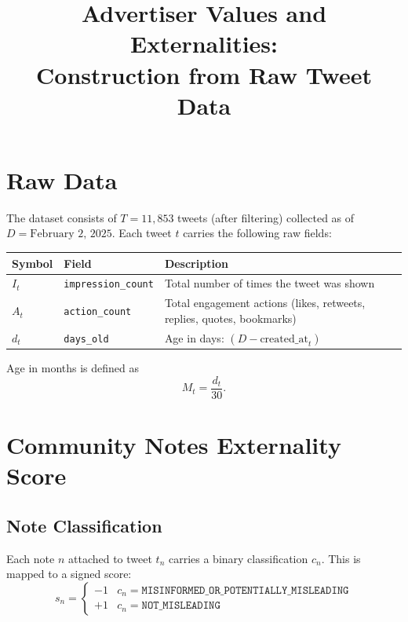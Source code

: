 \documentclass[11pt]{article}
\title{Advertiser Values and Externalities:\\Construction from Raw Tweet Data}
\date{}
\begin{document}
\maketitle

\section{Raw Data}

The dataset consists of $T = 11{,}853$ tweets (after filtering) collected as of $D = \text{February 2, 2025}$.
Each tweet $t$ carries the following raw fields:

\begin{center}
\begin{tabular}{lll}
\toprule
Symbol & Field & Description \\
\midrule
$I_t$ & \texttt{impression\_count} & Total number of times the tweet was shown \\
$A_t$ & \texttt{action\_count} & Total engagement actions (likes, retweets, replies, quotes, bookmarks) \\
$d_t$ & \texttt{days\_old} & Age in days: $(D - \text{created\_at}_t)$ \\
\bottomrule
\end{tabular}
\end{center}

\noindent
Age in months is defined as
\begin{equation}
    M_t = \frac{d_t}{30}.
\end{equation}

\section{Community Notes Externality Score}

\subsection{Note Classification}

Each note $n$ attached to tweet $t_n$ carries a binary classification $c_n$.
This is mapped to a signed score:
\begin{equation}
    s_n =
    \begin{cases}
        -1 & c_n = \texttt{MISINFORMED\_OR\_POTENTIALLY\_MISLEADING} \\
        +1 & c_n = \texttt{NOT\_MISLEADING}
    \end{cases}
\end{equation}
\end{document}
